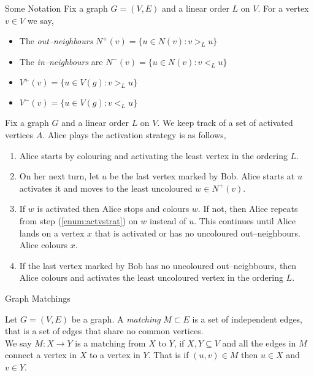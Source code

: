\documentclass{beamer}
\begin{document}
\begin{frame}{\secname}{Some Notation}
Fix a graph $G=(V,E)$ and a linear order $L$ on $V$. For a vertex $v\in V$ we say,
\begin{itemize}        
    \item The \textit{out--neighbours} $N^+(v)=\{u\in N(v):v>_L u\}$ 
    \item The \textit{in--neighbours} are $N^-(v)=\{u\in N(v):v<_L u\}$ 
    \item $V^+(v)=\{u\in V(g):v>_L u\}$     
    \item $V^-(v)=\{u\in V(g):v<_L u\}$ 
\end{itemize}
\end{frame}


\begin{frame}{\secname}
    Fix a graph $G$ and a linear order $L$ on $V$. We keep track of a set of activated vertices $A$. Alice plays the activation strategy is as follows,
    \begin{enumerate}
        \item Alice starts by colouring and activating the least vertex in the ordering $L$.
        \pause
        \item On her next turn, let $u$ be the last vertex marked by Bob.  Alice starts at $u$ activates it and moves to the least uncoloured $w\in N^+(v)$.
        \pause \label{enum:actvstrat}
        \item If $w$ is activated then Alice stops and colours $w$. If not, then Alice repeats from step (\ref{enum:actvstrat}) on $w$ instead of $u$. 
        This continues until Alice lands on a vertex $x$ that is activated or has no uncoloured out--neighbours. Alice colours $x$.
        \pause
        \item If the last vertex marked by Bob has no uncoloured out--neigbbours, then Alice colours and activates the least uncoloured vertex in the ordering $L$.
    \end{enumerate}
\end{frame}


\begin{frame}{\secname}{Graph Matchings}
    
    
    \begin{definition}[Matching]
        Let $G=(V,E)$ be a graph. A \textit{matching} $M\subset E$ is a set of independent edges, that is a set of edges that share no common vertices.\\
        
         We say $M:X \to Y$ is a matching from $X$ to $Y$, if $X,Y\subseteq V$ and all the edges in $M$ connect a vertex in $X$ to a vertex in $Y$. That is if $(u,v)\in M$ then $u\in X$ and $v\in Y$. 
        
    \end{definition}

\end{frame}
\end{document}
